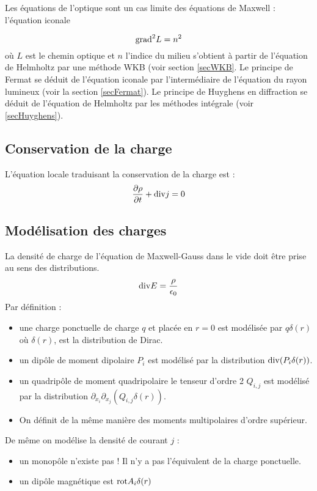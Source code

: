 \documentclass[12pt]{book}
\begin{document}
\begin{rem}
Les \'equations de l'optique sont un cas limite des \'equations de
Maxwell : l'\'equation iconale 

\begin{equation}
{\rm grad}^2 L=n^2
\end{equation}    
o\`u $L$ est le chemin optique et $n$ l'indice du milieu s'obtient \`a
partir de l'\'equation de Helmholtz par une m\'ethode WKB (voir
section \ref{secWKB}. Le principe de Fermat se d\'eduit de
l'\'equation iconale par l'interm\'ediaire de l'\'equation du rayon
lumineux (voir la section \ref{secFermat}). Le principe de Huyghens en
diffraction se d\'eduit de l'\'equation de Helmholtz par les
m\'ethodes int\'egrale (voir \ref{secHuyghens}).
\end{rem}




\subsection{Conservation de la charge}
L'\'equation locale traduisant la conservation de la charge est :
\begin{equation}\label{eqconsdelacharge}
\frac{\partial \rho}{\partial t}+{\rm div}{j}=0
\end{equation}
\subsection{Mod\'elisation  des charges}
La densit\'e de charge de l'\'equation de Maxwell-Gauss dans le vide
doit \^etre prise au sens des distributions. 
\begin{equation}
{\rm div} E=\frac{\rho}{\epsilon_0}
\end{equation}
Par d\'efinition :
\begin{itemize}
\item une charge ponctuelle de charge $q$ et plac\'ee en $r=0$ est
mod\'elis\'ee par $q\delta(r)$ o\`u $\delta(r)$, est la distribution
de Dirac. 
\item un dip\^ole de moment dipolaire $P_i$ est mod\'elis\'e par la
distribution ${\rm div}(P_i\delta(r))$. 
\item un quadrip\^ole de moment quadripolaire le tenseur
  d'ordre 2 
$Q_{i,j}$ est mod\'elis\'e par la distribution
$\partial_{x_i}\partial_{x_j}(Q_{i,j}\delta(r))$. 
\item On d\'efinit de la m\^eme mani\`ere des moments multipolaires
d'ordre sup\'erieur.
\end{itemize}
De m\^eme on mod\'elise la densit\'e de courant $j$ :
\begin{itemize}
\item un monop\^ole n'existe pas ! Il n'y a pas l'\'equivalent de la
charge ponctuelle. 
\item un dip\^ole magn\'etique est ${\rm rot} A_i\delta(r)$
\end{itemize}
\end{document}
